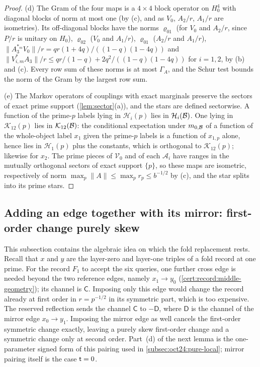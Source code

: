 \begin{proof}
(d) The Gram of the four maps is a $4\times4$ block operator on $H_0^4$ with
diagonal blocks of norm at most one (by (c), and as $V_0$, $A_2/r$, $A_1/r$ are
isometries). Its off-diagonal blocks have the norms $\varrho_{01}$ (for $V_0$ and
$A_2/r$, since $P/r$ is unitary on $H_0$), $\varrho_{02}$ ($V_0$ and $A_1/r$),
$\varrho_{01}$ ($A_2/r$ and $A_1/r$), $\|A_3^{*_m}V_0\|/r=qr(1+4q)/((1-q)(1-4q))$ and
$\|V^*_{i,m}A_3\|/r\le qr/(1-q)+2q^2/((1-q)(1-4q))$ for $i=1,2$, by (b) and (c).
Every row sum of these norms is at most $\Gamma_A$, and the Schur test bounds
the norm of the Gram by the largest row sum.

(e) The Markov operators of couplings with exact marginals preserve the
sectors of exact prime support (\cref{lem:sector}(a)), and the stars are
defined sectorwise. A function of the prime-$p$ labels lying in
$\mathcal H_i(p)$ lies in $\mathcal H_i(\mathcal B)$. One lying in $\mathcal K_{12}(p)$
lies in $\mathcal K_{12}(\mathcal B)$: the conditional expectation under $m_{0,\mathcal B}$ of a
function of the whole-object label $x_1$ given the prime-$p$ labels is a
function of $x_{1,p}$ alone, hence lies in $\mathcal H_1(p)$ plus the constants,
which is orthogonal to $\mathcal K_{12}(p)$; likewise for $x_2$. The prime pieces
of $\mathcal V_0$ and of each $\mathcal A_i$ have ranges in the mutually
orthogonal sectors of exact support $\{p\}$, so these maps are isometric,
respectively of norm $\max_p\|A\|\le\max_pr_p\le b^{-1/2}$ by (c), and the star
splits into its prime stars.
\end{proof}

\subsection{Adding an edge together with its mirror: first-order change purely skew}\label{subsec:mirror}

This subsection contains the algebraic idea on which the fold
replacement rests. Recall that $x$ and $y$ are the layer-zero and
layer-one triples of a fold record at one prime. For the record
$F_1$ to accept the six queries, one further cross edge is needed
beyond the two reference edges, namely $x_1\to y_0$
(\cref{cert:record:middle-geometry}); its channel is $\mathsf C$.
Imposing only this edge would change the record already at first
order in $r=p^{-1/2}$ in its symmetric part, which is too
expensive. The reserved reflection sends the channel $\mathsf C$
to $-\mathsf D$, where $\mathsf D$ is the channel of the mirror
edge $x_0\to y_1$. Imposing the mirror edge as well cancels the
first-order symmetric change exactly, leaving a purely skew
first-order change and a symmetric change only at second order.
Part~(d) of the next lemma is the one-parameter signed form of
this pairing used in \cref{subsec:oct24:pure-local}; mirror pairing
itself is the case $\mathsf t=0$.

